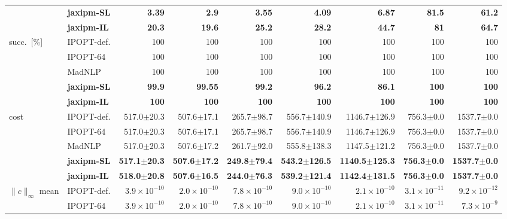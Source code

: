 \begin{table}[p]
{\begin{tabular}{@{}l l r r r r r r r@{}}
 & \textbf{jaxipm-SL} & \textbf{3.39} & \textbf{2.9} & \textbf{3.55} & \textbf{4.09} & \textbf{6.87} & \textbf{81.5} & \textbf{61.2} \\
 & \textbf{jaxipm-IL} & \textbf{20.3} & \textbf{19.6} & \textbf{25.2} & \textbf{28.2} & \textbf{44.7} & \textbf{81} & \textbf{64.7} \\
\midrule
\multirow{5}{*}{succ.\ [\%]} & IPOPT-def. & 100 & 100 & 100 & 100 & 100 & 100 & 100 \\
 & IPOPT-64 & 100 & 100 & 100 & 100 & 100 & 100 & 100 \\
 & MadNLP & 100 & 100 & 100 & 100 & 100 & 100 & 100 \\
 & \textbf{jaxipm-SL} & \textbf{99.9} & \textbf{99.55} & \textbf{99.2} & \textbf{96.2} & \textbf{86.1} & \textbf{100} & \textbf{100} \\
 & \textbf{jaxipm-IL} & \textbf{100} & \textbf{100} & \textbf{100} & \textbf{100} & \textbf{100} & \textbf{100} & \textbf{100} \\
\midrule
\multirow{5}{*}{cost} & IPOPT-def. & 517.0$\pm$20.3 & 507.6$\pm$17.1 & 265.7$\pm$98.7 & 556.7$\pm$140.9 & 1146.7$\pm$126.9 & 756.3$\pm$0.0 & 1537.7$\pm$0.0 \\
 & IPOPT-64 & 517.0$\pm$20.3 & 507.6$\pm$17.1 & 265.7$\pm$98.7 & 556.7$\pm$140.9 & 1146.7$\pm$126.9 & 756.3$\pm$0.0 & 1537.7$\pm$0.0 \\
 & MadNLP & 517.0$\pm$20.3 & 507.6$\pm$17.2 & 261.7$\pm$92.0 & 555.8$\pm$138.3 & 1147.5$\pm$121.2 & 756.3$\pm$0.0 & 1537.7$\pm$0.0 \\
 & \textbf{jaxipm-SL} & \textbf{517.1$\pm$20.3} & \textbf{507.6$\pm$17.2} & \textbf{249.8$\pm$79.4} & \textbf{543.2$\pm$126.5} & \textbf{1140.5$\pm$125.3} & \textbf{756.3$\pm$0.0} & \textbf{1537.7$\pm$0.0} \\
 & \textbf{jaxipm-IL} & \textbf{518.0$\pm$20.8} & \textbf{507.6$\pm$16.5} & \textbf{244.0$\pm$76.3} & \textbf{539.2$\pm$121.4} & \textbf{1142.4$\pm$131.5} & \textbf{756.3$\pm$0.0} & \textbf{1537.7$\pm$0.0} \\
\midrule
\multirow{5}{*}{$\|c\|_\infty$ mean} & IPOPT-def. & $3.9\!\times\!10^{-10}$ & $2.0\!\times\!10^{-10}$ & $7.8\!\times\!10^{-10}$ & $9.0\!\times\!10^{-10}$ & $2.1\!\times\!10^{-10}$ & $3.1\!\times\!10^{-11}$ & $9.2\!\times\!10^{-12}$ \\
 & IPOPT-64 & $3.9\!\times\!10^{-10}$ & $2.0\!\times\!10^{-10}$ & $7.8\!\times\!10^{-10}$ & $9.0\!\times\!10^{-10}$ & $2.1\!\times\!10^{-10}$ & $3.1\!\times\!10^{-11}$ & $7.3\!\times\!10^{-9}$ \\

\end{tabular}}
\end{table}
